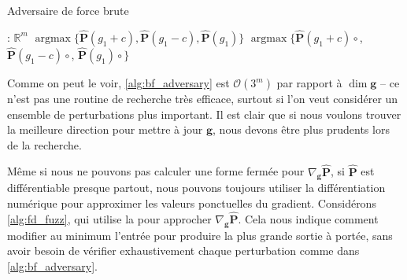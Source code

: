 \begin{algorithm}[H]
\caption{Adversaire de force brute}
\label{alg:bf_adversary}
\begin{algorithmic}[1]
: $\mathbb{R}^m$
 
\State \Return $\operatorname{argmax}\{\mathbf{\hat P}(g_1 + c), \mathbf{\hat P}(g_1 - c), \mathbf{\hat P}(g_1)\}$
\Else {}
\State \Return $\operatorname{argmax}\{\mathbf{\hat P}(g_1 + c) \circ$,\newline
\hspace*{10em} $\mathbf{\hat P}(g_1 - c)\circ$,\newline
\hspace*{10em} $\mathbf{\hat P}(g_1)\circ$$\}$
\EndIf
\EndProcedure
\end{algorithmic}
\end{algorithm}

Comme on peut le voir, \autoref{alg:bf_adversary} est $\mathcal{O}(3^m)$ par rapport à $\dim \mathbf g$ -- ce n'est pas une routine de recherche très efficace, surtout si l'on veut considérer un ensemble de perturbations plus important. Il est clair que si nous voulons trouver la meilleure direction pour mettre à jour $\mathbf g$, nous devons être plus prudents lors de la recherche.

Même si nous ne pouvons pas calculer une forme fermée pour $\nabla_{\mathbf g}\mathbf{\hat P}$, si $\mathbf{\hat P}$ est différentiable presque partout, nous pouvons toujours utiliser la différentiation numérique pour approximer les valeurs ponctuelles du gradient. Considérons \autoref{alg:fd_fuzz}, qui utilise la  pour approcher $\nabla_{\mathbf g}\mathbf{\hat P}$. Cela nous indique comment modifier au minimum l'entrée pour produire la plus grande sortie à portée, sans avoir besoin de vérifier exhaustivement chaque perturbation comme dans \autoref{alg:bf_adversary}.

